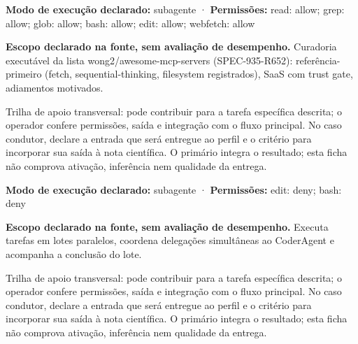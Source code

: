 \begin{arquitetura}
\textbf{Modo de execução declarado:} subagente · \textbf{Permissões:} read: allow; grep: allow; glob: allow; bash: allow; edit: allow; webfetch: allow
\end{arquitetura}


\begin{descricao}
\textbf{Escopo declarado na fonte, sem avaliação de desempenho.}
Curadoria executável da lista wong2/awesome-mcp-servers (SPEC-935-R652): referência-primeiro (fetch, sequential-thinking, filesystem registrados), SaaS com trust gate, adiamentos motivados.
\end{descricao}

\begin{funcao}
Trilha de apoio transversal: pode contribuir para a tarefa específica descrita; o operador confere permissões, saída e integração com o fluxo principal. No caso condutor, declare a entrada que será entregue ao perfil e o critério para incorporar sua saída à nota científica. O primário integra o resultado; esta ficha não comprova ativação, inferência nem qualidade da entrega.
\end{funcao}

\begin{arquitetura}
\textbf{Modo de execução declarado:} subagente · \textbf{Permissões:} edit: deny; bash: deny
\end{arquitetura}


\begin{descricao}
\textbf{Escopo declarado na fonte, sem avaliação de desempenho.}
Executa tarefas em lotes paralelos, coordena delegações simultâneas ao CoderAgent e acompanha a conclusão do lote.
\end{descricao}

\begin{funcao}
Trilha de apoio transversal: pode contribuir para a tarefa específica descrita; o operador confere permissões, saída e integração com o fluxo principal. No caso condutor, declare a entrada que será entregue ao perfil e o critério para incorporar sua saída à nota científica. O primário integra o resultado; esta ficha não comprova ativação, inferência nem qualidade da entrega.
\end{funcao}

